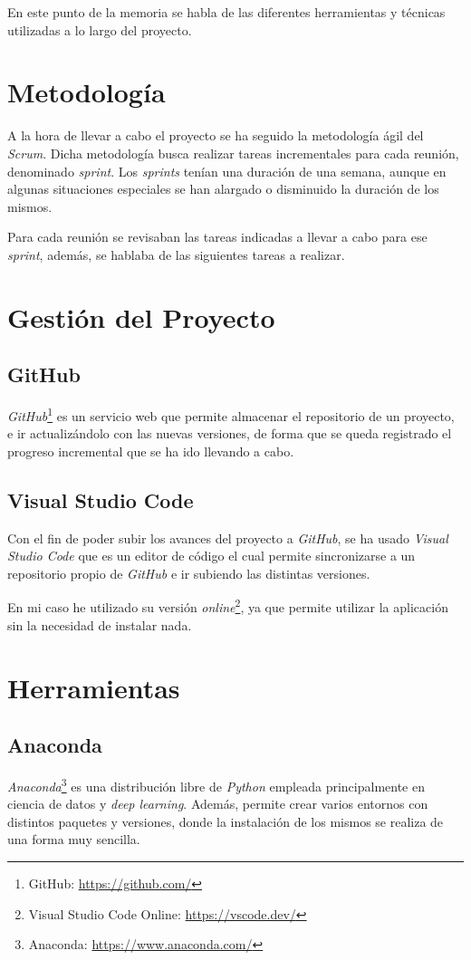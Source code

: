 
En este punto de la memoria se habla de las diferentes herramientas y técnicas utilizadas a lo largo del proyecto.

\section{Metodología}
A la hora de llevar a cabo el proyecto se ha seguido la metodología ágil del \emph{Scrum}. Dicha metodología busca realizar tareas incrementales para cada reunión, denominado \emph{sprint}. Los \emph{sprints} tenían una duración de una semana, aunque en algunas situaciones especiales se han alargado o disminuido la duración de los mismos.

Para cada reunión se revisaban las tareas indicadas a llevar a cabo para ese \emph{sprint}, además, se hablaba de las siguientes tareas a realizar.

\section{Gestión del Proyecto}
\subsection{GitHub}
\emph{GitHub}\footnote{GitHub: \url{https://github.com/}} es un servicio web que permite almacenar el repositorio de un proyecto, e ir actualizándolo con las nuevas versiones, de forma que se queda registrado el progreso incremental que se ha ido llevando a cabo.

\subsection{Visual Studio Code}
Con el fin de poder subir los avances del proyecto a \emph{GitHub}, se ha usado \emph{Visual Studio Code} que es un editor de código el cual permite sincronizarse a un repositorio propio de \emph{GitHub} e ir subiendo las distintas versiones.

En mi caso he utilizado su versión \emph{online}\footnote{ Visual Studio Code Online: \url{https://vscode.dev/}}, ya que permite utilizar la aplicación sin la necesidad de instalar nada.

\section{Herramientas}
\subsection{Anaconda}
\emph{Anaconda}\footnote{Anaconda: \url{https://www.anaconda.com/}} es una distribución libre de \emph{Python} empleada principalmente en ciencia de datos y \emph{deep learning}. Además, permite crear varios entornos con distintos paquetes y versiones, donde la instalación de los mismos se realiza de una forma muy sencilla.

